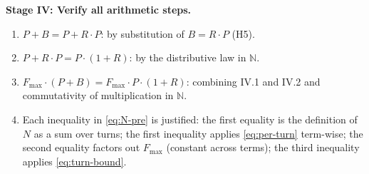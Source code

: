 \documentclass[12pt]{article}
\theoremstyle{definition}
\begin{document}
\medskip
\noindent\textbf{Stage IV: Verify all arithmetic steps.}
\begin{enumerate}
    \item[IV.1] $P + B = P + R \cdot P$:
                by substitution of $B = R \cdot P$ (H5). \checkmark
    \item[IV.2] $P + R \cdot P = P \cdot (1 + R)$:
                by the distributive law in $\mathbb{N}$. \checkmark
    \item[IV.3] $F_{\max} \cdot (P + B) = F_{\max} \cdot P \cdot (1+R)$:
                combining IV.1 and IV.2 and commutativity of
                multiplication in $\mathbb{N}$. \checkmark
    \item[IV.4] Each inequality in \eqref{eq:N-pre} is justified:
                the first equality is the definition of $N$ as a sum
                over turns; the first inequality applies
                \eqref{eq:per-turn} term-wise; the second equality
                factors out $F_{\max}$ (constant across terms); the
                third inequality applies \eqref{eq:turn-bound}.
                \checkmark
\end{enumerate}
\end{document}
